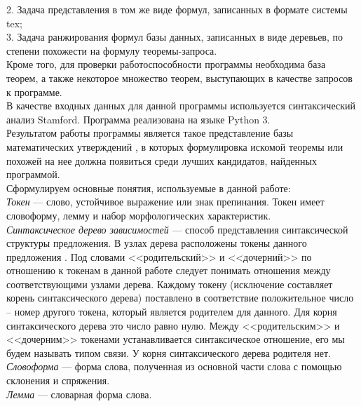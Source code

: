 \documentclass[12pt]{article}
\begin{document}
2. Задача представления в том же виде формул, записанных в формате системы tex; \\

3. Задача ранжирования формул базы данных, записанных в виде деревьев, по степени похожести  на  формулу  теоремы-запроса.  \\

Кроме того,  для  проверки работоспособности программы необходима база теорем, а также некоторое множество теорем, выступающих в качестве запросов к программе.\\

В качестве входных данных для данной программы используется синтаксический анализ Stamford. Программа реализована на языке Python 3.\\

Результатом работы программы является такое представление базы математических утверждений , в которых формулировка искомой теоремы или похожей на нее должна появиться среди лучших кандидатов, найденных программой.\\

Сформулируем основные понятия, используемые в данной работе: \\

\textit{Токен} —  слово, устойчивое выражение или знак препинания. Токен имеет словоформу, лемму и набор морфологических характеристик. \\

\textit{Синтаксическое дерево зависимостей} --- способ представления синтаксической структуры предложения. В узлах дерева расположены токены данного предложения \cite{Bolshakova}. Под словами <<родительский>> и <<дочерний>> по отношению к токенам в данной работе следует понимать отношения между соответствующими узлами дерева. Каждому токену (исключение составляет корень синтаксического дерева) поставлено в соответствие положительное число -- номер другого токена, который является родителем для данного. Для корня синтаксического дерева это число равно нулю. Между <<родительским>> и <<дочерним>> токенами устанавливается синтаксическое отношение, его мы будем называть типом связи. У корня синтаксического дерева родителя нет.\\

\textit{Словоформа} --- форма слова, полученная из основной части слова с помощью склонения и спряжения.\\

\textit{Лемма} --- словарная форма слова.\\
\end{document}

